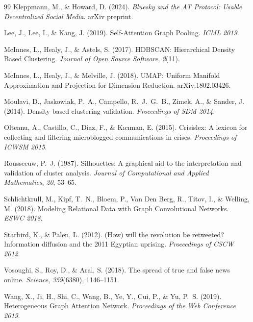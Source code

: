 \documentclass[12pt, a4paper]{article}
\begin{document}
\begin{thebibliography}{99}
Kleppmann, M., \& Howard, D. (2024).
\textit{Bluesky and the AT Protocol: Usable Decentralized Social Media}.
arXiv preprint.

Lee, J., Lee, I., \& Kang, J. (2019).
Self-Attention Graph Pooling.
\textit{ICML 2019}.

McInnes, L., Healy, J., \& Astels, S. (2017).
HDBSCAN: Hierarchical Density Based Clustering.
\textit{Journal of Open Source Software}, \textit{2}(11).

McInnes, L., Healy, J., \& Melville, J. (2018).
UMAP: Uniform Manifold Approximation and Projection for Dimension Reduction.
arXiv:1802.03426.

Moulavi, D., Jaskowiak, P.\ A., Campello, R.\ J.\ G.\ B., Zimek, A., \& Sander, J. (2014).
Density-based clustering validation.
\textit{Proceedings of SDM 2014}.

Olteanu, A., Castillo, C., Diaz, F., \& K{\i}c{\i}man, E. (2015).
Crisislex: A lexicon for collecting and filtering microblogged communications in crises.
\textit{Proceedings of ICWSM 2015}.

Rousseeuw, P.\ J. (1987).
Silhouettes: A graphical aid to the interpretation and validation of cluster analysis.
\textit{Journal of Computational and Applied Mathematics}, \textit{20}, 53--65.

Schlichtkrull, M., Kipf, T.\ N., Bloem, P., Van Den Berg, R., Titov, I., \& Welling, M. (2018).
Modeling Relational Data with Graph Convolutional Networks.
\textit{ESWC 2018}.

Starbird, K., \& Palen, L. (2012).
(How) will the revolution be retweeted? Information diffusion and the 2011 Egyptian uprising.
\textit{Proceedings of CSCW 2012}.

Vosoughi, S., Roy, D., \& Aral, S. (2018).
The spread of true and false news online.
\textit{Science}, \textit{359}(6380), 1146--1151.

Wang, X., Ji, H., Shi, C., Wang, B., Ye, Y., Cui, P., \& Yu, P.\ S. (2019).
Heterogeneous Graph Attention Network.
\textit{Proceedings of the Web Conference 2019}.


\end{thebibliography}
\end{document}

